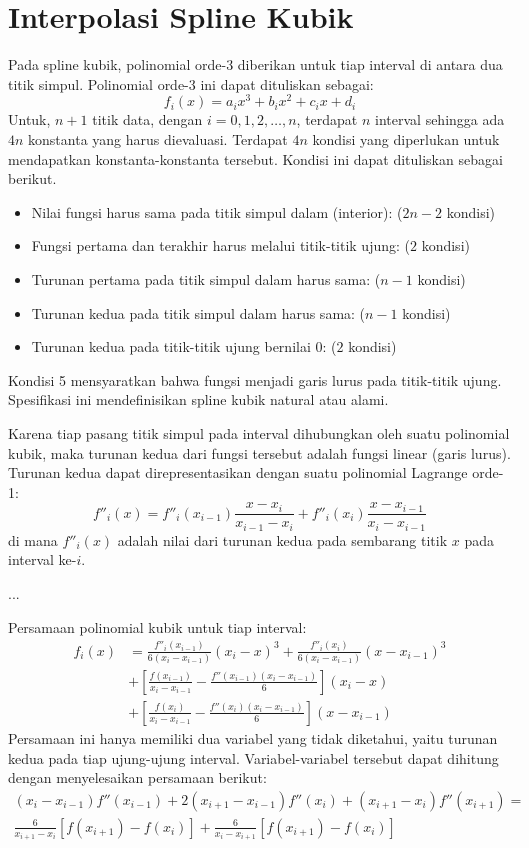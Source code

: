 \section{Interpolasi Spline Kubik}

Pada spline kubik, polinomial orde-3 diberikan untuk tiap interval di antara dua titik simpul. Polinomial orde-3 ini dapat dituliskan sebagai:
$$
f_i(x) = a_i x^3 + b_i x^2 + c_i x + d_i
$$
Untuk, $n+1$ titik data, dengan $i=0,1,2,\ldots,n$, terdapat $n$ interval sehingga ada $4n$ konstanta yang harus dievaluasi. Terdapat $4n$ kondisi yang diperlukan untuk mendapatkan konstanta-konstanta tersebut. Kondisi ini dapat dituliskan sebagai berikut.
\begin{itemize}
\item Nilai fungsi harus sama pada titik simpul dalam (interior): ($2n-2$ kondisi)
\item Fungsi pertama dan terakhir harus melalui titik-titik ujung: ($2$ kondisi)
\item Turunan pertama pada titik simpul dalam harus sama: ($n-1$ kondisi)
\item Turunan kedua pada titik simpul dalam harus sama: ($n-1$ kondisi)
\item Turunan kedua pada titik-titik ujung bernilai 0: ($2$ kondisi)
\end{itemize}
Kondisi 5 mensyaratkan bahwa fungsi menjadi garis lurus pada titik-titik ujung. Spesifikasi ini mendefinisikan spline kubik natural atau alami.

Karena tiap pasang titik simpul pada interval dihubungkan oleh suatu polinomial kubik,
maka turunan kedua dari fungsi tersebut adalah fungsi linear (garis lurus).
Turunan kedua dapat direpresentasikan dengan suatu polinomial Lagrange orde-1:
$$
f''_{i}(x) = f''_i(x_{i-1})\frac{x - x_{i}}{x_{i-1} - x_{i}} +
f''_i(x_{i})\frac{x - x_{i-1}}{x_{i} - x_{i-1}}
$$
di mana $f''_{i}(x)$ adalah nilai dari turunan kedua pada sembarang titik $x$ pada interval ke-$i$.

...


Persamaan polinomial kubik untuk tiap interval:
\begin{align*}
f_{i}(x) & =
\frac{f''_{i}(x_{i-1})}{6(x_{i} - x_{i-1})}(x_{i} - x)^3 +
\frac{f''_{i}(x_{i})}{6(x_{i} - x_{i-1})}(x - x_{i-1})^3 \\
& + \left[
\frac{f(x_{i-1})}{x_{i} - x_{i-1}} - \frac{f''(x_{i-1}) (x_i - x_{i-1})}{6}
\right] (x_i - x) \\
& + \left[
\frac{f(x_{i})}{x_{i} - x_{i-1}} - \frac{f''(x_{i}) (x_i - x_{i-1})}{6}
\right] (x - x_{i-1})
\end{align*}
Persamaan ini hanya memiliki dua variabel yang tidak diketahui, yaitu turunan kedua
pada tiap ujung-ujung interval. Variabel-variabel tersebut dapat dihitung dengan menyelesaikan
persamaan berikut:
\begin{multline*}
(x_i - x_{i-1}) f''(x_{i-1}) + 2(x_{i+1} - x_{i-1}) f''(x_{i}) + (x_{i+1} - x_{i})f''(x_{i+1}) = \\
\frac{6}{x_{i+1} - x_{i}} \left[ f(x_{i+1}) - f(x_i) \right] +
\frac{6}{x_{i} - x_{i+1}} \left[ f(x_{i+1}) - f(x_i) \right]
\end{multline*}

